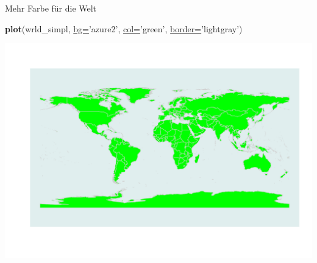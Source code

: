 \documentclass[ignorenonframetext,]{beamer}
\newenvironment{Shaded}{\begin{snugshade}}{\end{snugshade}}
\newcommand{\DataTypeTok}[1]{\textcolor[rgb]{0.74,0.68,0.62}{\underline{#1}}}
\newcommand{\KeywordTok}[1]{\textcolor[rgb]{0.26,0.66,0.93}{\textbf{#1}}}
\newcommand{\NormalTok}[1]{\textcolor[rgb]{0.74,0.68,0.62}{#1}}
\newcommand{\StringTok}[1]{\textcolor[rgb]{0.02,0.61,0.04}{#1}}
\begin{document}
\begin{frame}[fragile]{Mehr Farbe für die Welt}
\protect\hypertarget{mehr-farbe-fur-die-welt}{}

\begin{Shaded}
\begin{Highlighting}[]
\KeywordTok{plot}\NormalTok{(wrld_simpl, }\DataTypeTok{bg=}\StringTok{'azure2'}\NormalTok{, }\DataTypeTok{col=}\StringTok{'green'}\NormalTok{,}
     \DataTypeTok{border=}\StringTok{'lightgray'}\NormalTok{)}
\end{Highlighting}
\end{Shaded}

\includegraphics{Geomedizin_files/figure-beamer/unnamed-chunk-74-1.pdf}

\end{frame}
\end{document}

